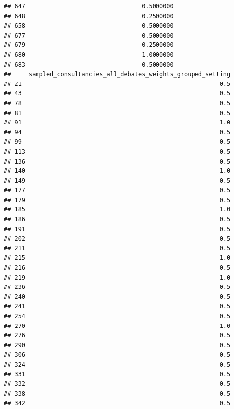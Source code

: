 \documentclass[
]{article}
\begin{document}
\begin{verbatim}
## 647                                 0.5000000
## 648                                 0.2500000
## 658                                 0.5000000
## 677                                 0.5000000
## 679                                 0.2500000
## 680                                 1.0000000
## 683                                 0.5000000
##     sampled_consultancies_all_debates_weights_grouped_setting
## 21                                                        0.5
## 43                                                        0.5
## 78                                                        0.5
## 81                                                        0.5
## 91                                                        1.0
## 94                                                        0.5
## 99                                                        0.5
## 113                                                       0.5
## 136                                                       0.5
## 140                                                       1.0
## 149                                                       0.5
## 177                                                       0.5
## 179                                                       0.5
## 185                                                       1.0
## 186                                                       0.5
## 191                                                       0.5
## 202                                                       0.5
## 211                                                       0.5
## 215                                                       1.0
## 216                                                       0.5
## 219                                                       1.0
## 236                                                       0.5
## 240                                                       0.5
## 241                                                       0.5
## 254                                                       0.5
## 270                                                       1.0
## 276                                                       0.5
## 290                                                       0.5
## 306                                                       0.5
## 324                                                       0.5
## 331                                                       0.5
## 332                                                       0.5
## 338                                                       0.5
## 342                                                       0.5

\end{verbatim}
\end{document}
